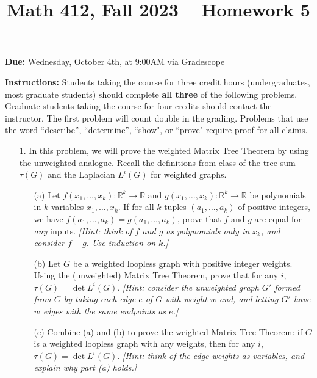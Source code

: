 \documentclass[12pt]{article}
\title{Math 412, Fall 2023 -- Homework 5}
\date{}
\newcommand{\R}{\mathbb{R}}
\begin{document}
 \maketitle
\vspace{-80pt}

\textbf{Due:} Wednesday, October 4th, at 9:00AM via Gradescope

\textbf{Instructions:} Students taking the course for three credit hours (undergraduates, most graduate
students) should complete \textbf{all three} of the following problems. Graduate students
taking the course for four credits should contact the instructor. The first problem will count double in the grading. Problems that use the word ``describe”, ``determine”, ``show", or ``prove" require proof for all claims.

\begin{enumerate}

\item[1.] In this problem, we will prove the weighted Matrix Tree Theorem by using the unweighted analogue. Recall the definitions from class of the tree sum $\tau(G)$ and the Laplacian $L^i(G)$ for weighted graphs.

\begin{enumerate}
    \item[(a)] Let $f(x_1,\ldots,x_k):\R^k\to \R$ and $g(x_1,\ldots,x_k):\R^k\to\R$ be polynomials in $k$-variables $x_1,\ldots, x_k$. If for all $k$-tuples $(a_1,\ldots,a_k)$ of positive integers, we have $f(a_1,\ldots,a_k) = g(a_1,\ldots,a_k)$, prove that $f$ and $g$ are equal for \emph{any} inputs. \emph{[Hint: think of $f$ and $g$ as polynomials only in $x_k$, and consider $f-g$. Use induction on $k$.]}
    
    \item[(b)] Let $G$ be a weighted loopless graph with positive integer weights. Using the (unweighted) Matrix Tree Theorem, prove that for any $i$, $\tau(G) = \det L^i(G)$. \emph{[Hint: consider the unweighted graph $G'$ formed from $G$ by taking each edge $e$ of $G$ with weight $w$ and, and letting $G'$ have $w$ edges with the same endpoints as $e$.]}

    \item[(c)] Combine (a) and (b) to prove the weighted Matrix Tree Theorem: if $G$ is a weighted loopless graph with any weights, then for any $i$, $\tau(G) = \det L^i(G)$. \emph{[Hint: think of the edge weights as variables, and explain why part (a) holds.]}

\end{enumerate}


\end{enumerate}
\end{document}
